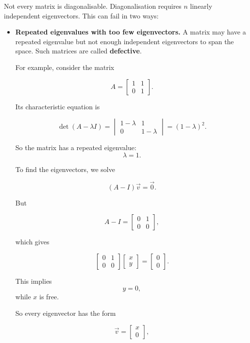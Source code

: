\documentclass[11pt,openany]{book}
\theoremstyle{definition}
\begin{document}
Not every matrix is diagonalisable. Diagonalisation requires $n$ linearly 
independent eigenvectors. This can fail in two ways:

\begin{itemize}
  \item \textbf{Repeated eigenvalues with too few eigenvectors.} A matrix may 
have a repeated eigenvalue but not enough independent eigenvectors to span the 
space. Such matrices are called \textbf{defective}.

\medskip

For example, consider the matrix

\[
A =
\begin{bmatrix}
1 & 1 \\
0 & 1
\end{bmatrix}.
\]

Its characteristic equation is

\[
\det(A - \lambda I)
=
\begin{vmatrix}
1-\lambda & 1 \\
0 & 1-\lambda
\end{vmatrix}
=
(1-\lambda)^2.
\]

So the matrix has a repeated eigenvalue:
\[
\lambda = 1.
\]

\medskip

To find the eigenvectors, we solve

\[
(A-I)\vec{v} = \vec{0}.
\]

But

\[
A-I =
\begin{bmatrix}
0 & 1 \\
0 & 0
\end{bmatrix},
\]

which gives

\[
\begin{bmatrix}
0 & 1 \\
0 & 0
\end{bmatrix}
\begin{bmatrix}
x \\
y
\end{bmatrix}
=
\begin{bmatrix}
0 \\
0
\end{bmatrix}.
\]

This implies
\[
y = 0,
\]
while $x$ is free.

\medskip

So every eigenvector has the form

\[
\vec{v} =
\begin{bmatrix}
x \\
0
\end{bmatrix},
\]


\end{itemize}
\end{document}
